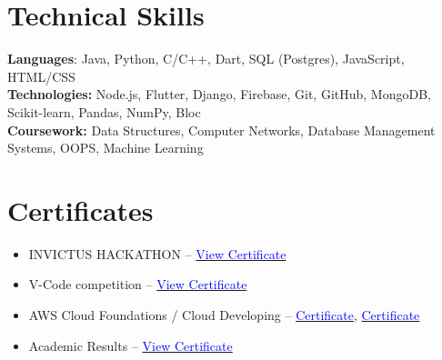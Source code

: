 \documentclass[letterpaper,11pt]{article}
\begin{document}
%
\section{Technical Skills}
\vspace{-6pt} %
 \begin{itemize}[leftmargin=*, label={}]
    \small{\item{
     \textbf{Languages}{: Java, Python, C/C++, Dart, SQL (Postgres), JavaScript, HTML/CSS} \\
     \textbf{Technologies:} Node.js, Flutter, Django, Firebase, Git, GitHub, MongoDB, Scikit-learn, Pandas, NumPy, Bloc \\
     \textbf{Coursework:} Data Structures, Computer Networks, Database Management Systems, OOPS, Machine Learning}}
 \end{itemize}

\section{Certificates}
\vspace{-6pt} %
\begin{itemize}[leftmargin=*, itemsep=2pt, topsep=0pt]
    \item INVICTUS HACKATHON –  
    \href{https://drive.google.com/file/d/1ItDT6zJNX-dR8Q9L2tRwCX0G1nKjzWyE/view?usp=sharing}{\textcolor{blue}{View Certificate}}
    
    \item V-Code competition – 
    \href{https://drive.google.com/file/d/1HHi6MovOpgedT_TI621zTQGj8My7PCKO/view?usp=sharing}{\textcolor{blue}{View Certificate}}
    
    \item AWS Cloud Foundations / Cloud Developing – 
    \href{https://www.credly.com/badges/abbcc651-a313-481c-824c-65259956e28e/public_url}{\textcolor{blue}{Certificate}},
    \href{https://www.credly.com/badges/63bb92de-2471-45a1-adab-fa77cd652c18}{\textcolor{blue}{Certificate}}
    
    \item Academic Results – 
    \href{https://drive.google.com/drive/folders/1Iw67umZSwyV2NDYWwHCU7l4OKAHH8wb5?usp=sharing}{\textcolor{blue}{View Certificate}}

\end{itemize}
\end{document}
